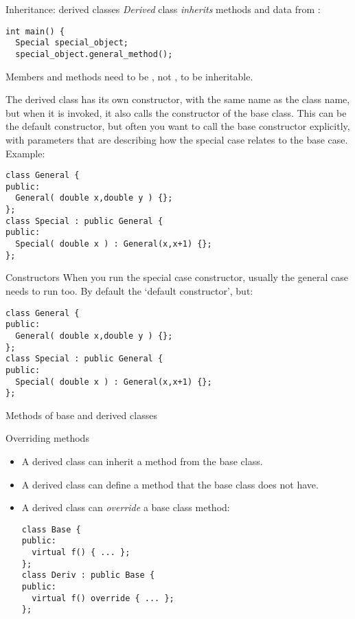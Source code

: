 \begin{slide}{Inheritance: derived classes}
  \label{sl:obj-derive}
  \emph{Derived} class 
  \emph{inherits} methods and data from
   :
\begin{lstlisting}
int main() {
  Special special_object;
  special_object.general_method();
\end{lstlisting}
Members and methods need to be , not , to be inheritable.
\end{slide}

The derived class has its own constructor, with the same name as the
class name, but when it is invoked, it also calls the constructor of
the base class. This can be the default constructor, but often you
want to call the base constructor explicitly, with parameters that are
describing how the special case relates to the base case. Example:
\begin{lstlisting}
class General {
public:
  General( double x,double y ) {};
};
class Special : public General {
public:
  Special( double x ) : General(x,x+1) {};
};
\end{lstlisting}

\begin{slide}{Constructors}
  \label{sl:obj-derive-construct}
  When you run the special case constructor, usually the general case
  needs to run too. By default the `default constructor', but:
\begin{lstlisting}
class General {
public:
  General( double x,double y ) {};
};
class Special : public General {
public:
  Special( double x ) : General(x,x+1) {};
};
\end{lstlisting}
\end{slide}

 {Methods of base and derived classes}
\label{sec:derive-method}

\begin{block}{Overriding methods}
  \label{sl:obj-method-override}
  \begin{itemize}
  \item A derived class can inherit a method from the base class.
  \item A derived class can define a method that the base class does
    not have.
  \item A derived class can \emph{override} a
    base class method:
\begin{lstlisting}
class Base {
public:
  virtual f() { ... };
};
class Deriv : public Base {
public:
  virtual f() override { ... };
};
\end{lstlisting}
  \end{itemize}
\end{block}

